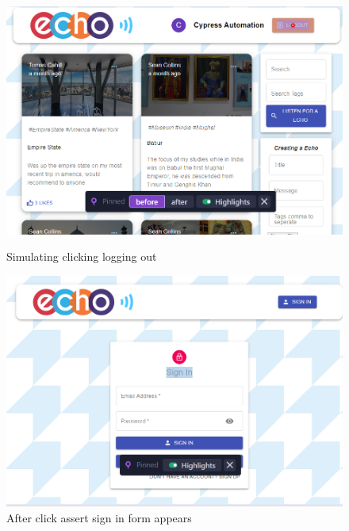 \begin{figure}[ht]
\begin{minipage}[b]{0.4\linewidth}
    \centering
    \includegraphics[width=\linewidth]{images/LogOutOne}
    \caption{Simulating clicking logging out}
    \label{image:LogOutOne}
\end{minipage}
    \hspace{0.5cm}
    \begin{minipage}[b]{0.4\linewidth}
    \centering
   \includegraphics[width=\linewidth]{images/LogOutTwo}
    \caption{After click assert sign in form appears}
    \label{image:LogOutTwo}
\end{minipage}
\end{figure}

\newpage
